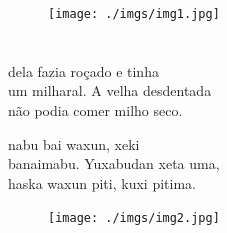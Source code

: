 \pagebreak
\thispagestyle{empty}
\begin{figure}
\vspace*{-1.6cm}
\hspace*{-2.2cm}\texttt{[image: ./imgs/img1.jpg]}
\end{figure}

\chapter*{}

\mbox{}\vspace*{\fill}




 dela fazia roçado e tinha\\
um milharal. A velha desdentada\\
não podia comer milho seco.

\vspace{2em}

 nabu bai waxun, xeki\\
banaimabu. Yuxabudan xeta uma,\\
haska waxun piti, kuxi pitima.

\vspace*{\fill}

\pagebreak
\thispagestyle{empty}
\begin{figure}
\vspace*{-1.6cm}
\hspace*{-2.2cm}\texttt{[image: ./imgs/img2.jpg]}
\end{figure}

\chapter*{}

\vspace*{-\baselineskip}

